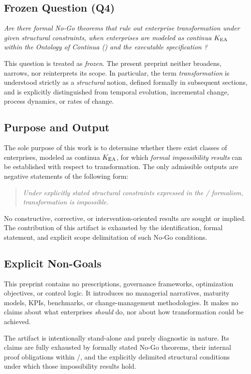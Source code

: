﻿\subsection*{Frozen Question (Q4)}

\emph{Are there formal No-Go theorems that rule out enterprise transformation
under given structural constraints, when enterprises are modeled as continua
$K_{\mathrm{EA}}$ within the Ontology of Continua (\OC) and the executable specification
?}

This question is treated as \emph{frozen}. The present preprint neither
broadens, narrows, nor reinterprets its scope. In particular, the term
\emph{transformation} is understood strictly as a \emph{structural} notion,
defined formally in subsequent sections, and is explicitly distinguished from
temporal evolution, incremental change, process dynamics, or rates of change.

\subsection*{Purpose and Output}

The sole purpose of this work is to determine whether there exist classes of
enterprises, modeled as continua $K_{\mathrm{EA}}$, for which \emph{formal impossibility
results} can be established with respect to transformation. The only admissible
outputs are negative statements of the following form:

\begin{quote}
\emph{Under explicitly stated structural constraints expressed in the
\OC/ formalism, transformation is impossible.}
\end{quote}

No constructive, corrective, or intervention-oriented results are sought or
implied. The contribution of this artifact is exhausted by the identification,
formal statement, and explicit scope delimitation of such No-Go conditions.

\subsection*{Explicit Non-Goals}

This preprint contains no prescriptions, governance frameworks, optimization
objectives, or control logic. It introduces no managerial narratives, maturity
models, KPIs, benchmarks, or change-management methodologies. It makes no
claims about what enterprises \emph{should} do, nor about how transformation
could be achieved.

The artifact is intentionally stand-alone and purely diagnostic in nature. Its
claims are fully exhausted by formally stated No-Go theorems, their internal
proof obligations within \OC/, and the explicitly delimited structural
conditions under which those impossibility results hold.
